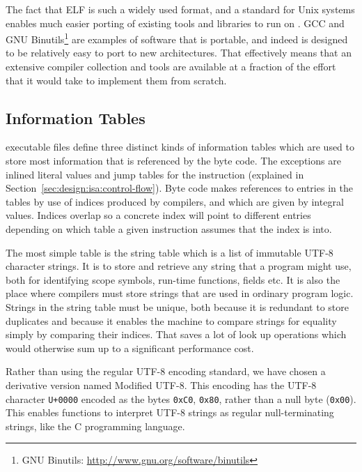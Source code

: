 The fact that ELF is such a widely used format, and a standard for Unix systems
enables much easier porting of existing tools and libraries to run on
\thename{}. GCC and GNU Binutils\footnote{GNU Binutils:
  \url{http://www.gnu.org/software/binutils}} are examples of software that is
portable, and indeed is designed to be relatively easy to port to new
architectures. That effectively means that an extensive compiler collection and
tools are available at a fraction of the effort that it would take to implement
them from scratch.


\subsection{Information Tables}

\thename{} executable files define three distinct kinds of information tables
which are used to store most information that is referenced by the byte
code. The exceptions are inlined literal values and jump tables for the
 instruction (explained in
Section~\ref{sec:design:isa:control-flow}). Byte code makes references to
entries in the tables by use of indices produced by compilers, and which are
given by integral values. Indices overlap so a concrete index will point to
different entries depending on which table a given instruction assumes that the
index is into.

The most simple table is the string table which is a list of immutable UTF-8
character strings. It is to store and retrieve any string that a program might
use, both for identifying scope symbols, run-time functions, fields etc. It is
also the place where compilers must store strings that are used in ordinary
program logic. Strings in the string table must be unique, both because it is
redundant to store duplicates and because it enables the machine to compare
strings for equality simply by comparing their indices. That saves a lot of look
up operations which would otherwise sum up to a significant performance cost.

Rather than using the regular UTF-8 encoding standard, we have chosen a
derivative version named Modified UTF-8. This encoding has the UTF-8 character
{\tt U+0000} encoded as the bytes {\tt 0xC0}, {\tt 0x80}, rather than a null
byte ({\tt 0x00}). This enables functions to interpret UTF-8 strings as regular
null-terminating strings, like the C programming language.

